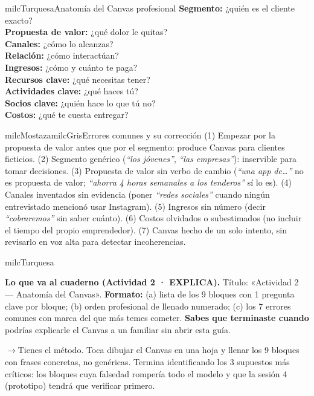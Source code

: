 \documentclass[11pt,letterpaper]{article}
\newcommand{\puente}[1]{%
  \begin{puentebox}%
    \textcolor{milcGradeDark}{$\rightarrow$}\hspace{2mm}#1%
  \end{puentebox}%
}
\begin{document}
\begin{drawbox}{milcTurquesa}{Anatomía del Canvas profesional}
\textbf{Segmento:} ¿quién es el cliente exacto? \\[1mm] \textbf{Propuesta de valor:} ¿qué dolor le quitas? \\[1mm] \textbf{Canales:} ¿cómo lo alcanzas? \\[1mm] \textbf{Relación:} ¿cómo interactúan? \\[1mm] \textbf{Ingresos:} ¿cómo y cuánto te paga? \\[1mm] \textbf{Recursos clave:} ¿qué necesitas tener? \\[1mm] \textbf{Actividades clave:} ¿qué haces tú? \\[1mm] \textbf{Socios clave:} ¿quién hace lo que tú no? \\[1mm] \textbf{Costos:} ¿qué te cuesta entregar?
\end{drawbox}

\begin{softbox}{milcMostaza}{milcGris}{Errores comunes y su corrección}
(1) Empezar por la propuesta de valor antes que por el segmento: produce Canvas para clientes ficticios. (2) Segmento genérico (\emph{``los jóvenes''}, \emph{``las empresas''}): inservible para tomar decisiones. (3) Propuesta de valor sin verbo de cambio (\emph{``una app de…''} no es propuesta de valor; \emph{``ahorra 4 horas semanales a los tenderos''} sí lo es). (4) Canales inventados sin evidencia (poner \emph{``redes sociales''} cuando ningún entrevistado mencionó usar Instagram). (5) Ingresos sin número (decir \emph{``cobraremos''} sin saber cuánto). (6) Costos olvidados o subestimados (no incluir el tiempo del propio emprendedor). (7) Canvas hecho de un solo intento, sin revisarlo en voz alta para detectar incoherencias.
\end{softbox}

\begin{infoband}{milcTurquesa}


\textbf{Lo que va al cuaderno (Actividad 2 · EXPLICA).} Título: «Actividad 2 --- Anatomía del Canvas». \textbf{Formato:} (a) lista de los 9 bloques con 1 pregunta clave por bloque; (b) orden profesional de llenado numerado; (c) los 7 errores comunes con marca del que más temes cometer. \textbf{Sabes que terminaste cuando} podrías explicarle el Canvas a un familiar sin abrir esta guía.
\end{infoband}

\puente{Tienes el método. Toca dibujar el Canvas en una hoja y llenar los 9 bloques con frases concretas, no genéricas. Termina identificando los 3 supuestos más críticos: los bloques cuya falsedad rompería todo el modelo y que la sesión 4 (prototipo) tendrá que verificar primero.}
\end{document}
